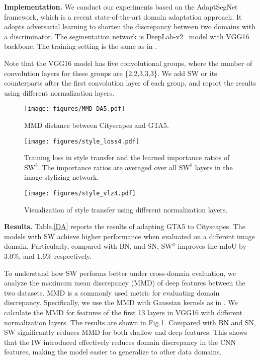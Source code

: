 \documentclass[10pt,twocolumn,letterpaper]{article}
\begin{document}
\noindent\textbf{Implementation.} 
We conduct our experiments based on the AdaptSegNet~\cite{tsai2018learning} framework, which is a recent state-of-the-art domain adaptation approach.
It adopts adversarial learning to shorten the discrepancy between two domains with a discriminator.
The segmentation network is DeepLab-v2~\cite{chen2018deeplab} model with VGG16~\cite{simonyan2014very} backbone.
The training setting is the same as in \cite{tsai2018learning}.

Note that the VGG16 model has five convolutional groups, where the number of convolution layers for these groups are \{2,2,3,3,3\}.
We add SW or its counterparts after the first convolution layer of each group, and report the results using different normalization layers.

\begin{figure}[t!]
	\centering
	\texttt{[image: figures/MMD\_DA5.pdf]}
	\caption{MMD distance between Cityscapes and GTA5.}
	\label{MMD}
	\vspace{-10pt}
\end{figure}

\begin{figure*}[t!]
	\centering
	\texttt{[image: figures/style\_loss4.pdf]}
	\caption{Training loss in style transfer and the learned importance ratios of $\text{SW}^{b}$. The importance ratios are averaged over all $\text{SW}^{b}$ layers in the image stylizing network. }
	\label{style_loss}
	\vspace{-12pt}
\end{figure*}

\begin{figure}[t!]
	\centering
	\texttt{[image: figures/style\_vlz4.pdf]}
	\vspace{-5pt}
	\caption{Visualization of style transfer using different normalization layers.}
	\label{visualize}
	\vspace{-10pt}
\end{figure}

\noindent\textbf{Results.} 
Table.\ref{DA} reports the results of adapting GTA5 to Cityscapes.
The models with SW achieve higher performance when evaluated on a different image domain.
Particularly, compared with BN, and SN, $\text{SW}^{a}$ improves the mIoU by 3.0\%, and 1.6\% respectively.

To understand how SW performs better under cross-domain evaluation, we analyze the maximum mean discrepancy (MMD)\cite{gretton2012kernel} of deep features between the two datasets.
MMD is a commonly used metric for evaluating domain discrepancy.
Specifically, we use the MMD with Gaussian kernels as in \cite{li2017mmd}.
We calculate the MMD for features of the first 13 layers in VGG16 with different normalization layers.
The results are shown in Fig.\ref{MMD}.
Compared with BN and SN, SW significantly reduces MMD for both shallow and deep features.
This shows that the IW introduced effectively reduces domain discrepancy in the CNN features, making the model easier to generalize to other data domains.
\end{document}
